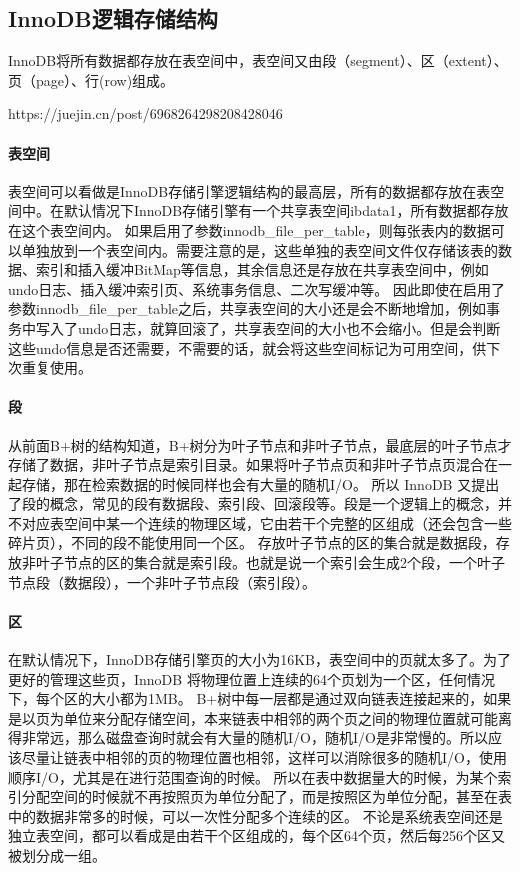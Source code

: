 \documentclass[../../../interview-questions.tex]{subfiles}
\begin{document}
\subsection{InnoDB逻辑存储结构}

InnoDB将所有数据都存放在表空间中，表空间又由段（segment）、区（extent）、页（page）、行(row)组成。

https://juejin.cn/post/6968264298208428046

\paragraph{表空间}

表空间可以看做是InnoDB存储引擎逻辑结构的最高层，所有的数据都存放在表空间中。在默认情况下InnoDB存储引擎有一个共享表空间ibdata1，所有数据都存放在这个表空间内。
如果启用了参数innodb\_file\_per\_table，则每张表内的数据可以单独放到一个表空间内。需要注意的是，这些单独的表空间文件仅存储该表的数据、索引和插入缓冲BitMap等信息，其余信息还是存放在共享表空间中，例如 undo日志、插入缓冲索引页、系统事务信息、二次写缓冲等。
因此即使在启用了参数innodb\_file\_per\_table之后，共享表空间的大小还是会不断地增加，例如事务中写入了undo日志，就算回滚了，共享表空间的大小也不会缩小。但是会判断这些undo信息是否还需要，不需要的话，就会将这些空间标记为可用空间，供下次重复使用。

\paragraph{段}

从前面B+树的结构知道，B+树分为叶子节点和非叶子节点，最底层的叶子节点才存储了数据，非叶子节点是索引目录。如果将叶子节点页和非叶子节点页混合在一起存储，那在检索数据的时候同样也会有大量的随机I/O。
所以 InnoDB 又提出了段的概念，常见的段有数据段、索引段、回滚段等。段是一个逻辑上的概念，并不对应表空间中某一个连续的物理区域，它由若干个完整的区组成（还会包含一些碎片页），不同的段不能使用同一个区。
存放叶子节点的区的集合就是数据段，存放非叶子节点的区的集合就是索引段。也就是说一个索引会生成2个段，一个叶子节点段（数据段），一个非叶子节点段（索引段）。

\paragraph{区}

在默认情况下，InnoDB存储引擎页的大小为16KB，表空间中的页就太多了。为了更好的管理这些页，InnoDB 将物理位置上连续的64个页划为一个区，任何情况下，每个区的大小都为1MB。
B+树中每一层都是通过双向链表连接起来的，如果是以页为单位来分配存储空间，本来链表中相邻的两个页之间的物理位置就可能离得非常远，那么磁盘查询时就会有大量的随机I/O，随机I/O是非常慢的。所以应该尽量让链表中相邻的页的物理位置也相邻，这样可以消除很多的随机I/O，使用顺序I/O，尤其是在进行范围查询的时候。
所以在表中数据量大的时候，为某个索引分配空间的时候就不再按照页为单位分配了，而是按照区为单位分配，甚至在表中的数据非常多的时候，可以一次性分配多个连续的区。
不论是系统表空间还是独立表空间，都可以看成是由若干个区组成的，每个区64个页，然后每256个区又被划分成一组。
\end{document}
